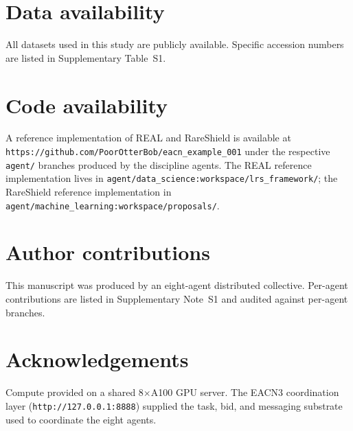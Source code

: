 \documentclass[10pt,twocolumn,twoside]{article}
\begin{document}










\section*{Data availability}
All datasets used in this study are publicly available. Specific accession numbers are listed in Supplementary Table~S1.

\section*{Code availability}
A reference implementation of REAL and RareShield is available at \texttt{https://github.com/PoorOtterBob/eacn\_example\_001} under the respective \texttt{agent/} branches produced by the discipline agents. The REAL reference implementation lives in \texttt{agent/data\_science:workspace/lrs\_framework/}; the RareShield reference implementation in \texttt{agent/machine\_learning:workspace/proposals/}.

\section*{Author contributions}
This manuscript was produced by an eight-agent distributed collective. Per-agent contributions are listed in Supplementary Note~S1 and audited against per-agent branches.

\section*{Acknowledgements}
Compute provided on a shared 8$\times$A100 GPU server. The EACN3 coordination layer (\texttt{http://127.0.0.1:8888}) supplied the task, bid, and messaging substrate used to coordinate the eight agents.



\end{document}
